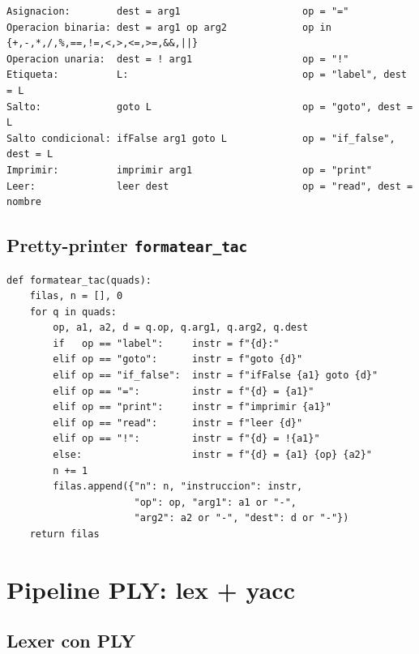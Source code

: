 \documentclass[11pt,a4paper]{article}
\begin{document}
\begin{lstlisting}[style=tac]
Asignacion:        dest = arg1                     op = "="
Operacion binaria: dest = arg1 op arg2             op in {+,-,*,/,%,==,!=,<,>,<=,>=,&&,||}
Operacion unaria:  dest = ! arg1                   op = "!"
Etiqueta:          L:                              op = "label", dest = L
Salto:             goto L                          op = "goto", dest = L
Salto condicional: ifFalse arg1 goto L             op = "if_false", dest = L
Imprimir:          imprimir arg1                   op = "print"
Leer:              leer dest                       op = "read", dest = nombre
\end{lstlisting}

\subsection{Pretty-printer \texttt{formatear\_tac}}

\begin{lstlisting}[style=py]
def formatear_tac(quads):
    filas, n = [], 0
    for q in quads:
        op, a1, a2, d = q.op, q.arg1, q.arg2, q.dest
        if   op == "label":     instr = f"{d}:"
        elif op == "goto":      instr = f"goto {d}"
        elif op == "if_false":  instr = f"ifFalse {a1} goto {d}"
        elif op == "=":         instr = f"{d} = {a1}"
        elif op == "print":     instr = f"imprimir {a1}"
        elif op == "read":      instr = f"leer {d}"
        elif op == "!":         instr = f"{d} = !{a1}"
        else:                   instr = f"{d} = {a1} {op} {a2}"
        n += 1
        filas.append({"n": n, "instruccion": instr,
                      "op": op, "arg1": a1 or "-",
                      "arg2": a2 or "-", "dest": d or "-"})
    return filas
\end{lstlisting}

\section{Pipeline PLY: lex + yacc}

\subsection{Lexer con PLY}
\end{document}
